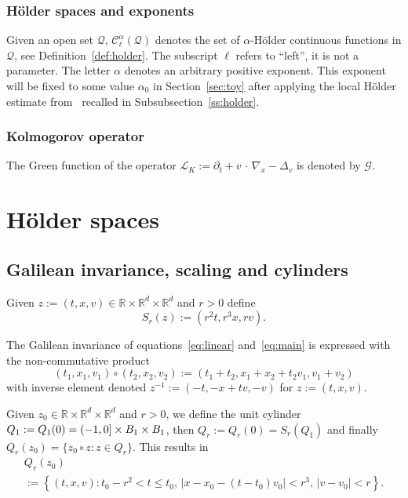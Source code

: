 \documentclass[10pt]{amsart}
\theoremstyle{definition}\newtheorem{defi}[theo]{Definition}\newtheorem{rema}[theo]{Remark}\newtheorem{exam}[theo]{Example}\newtheorem{exem}[theo]{Example}\newtheorem{nota}[theo]{Notation}
\newcommand{\R}{\mathbb{R}}
\newcommand{\cC}{\mathcal{C}}
\newcommand{\cL}{\mathcal{L}}
\newcommand{\cG}{\mathcal{G}}
\newcommand{\cQ}{\mathcal{Q}}
\begin{document}
\subsubsection{H\"older spaces and exponents}
Given an open set $\cQ$, $\cC_\ell^\alpha (\cQ)$ denotes the set of $\alpha$-H\"older continuous functions in $\cQ$, see Definition~\ref{def:holder}. The subscript $\ell$ refers to ``left'', it is not a parameter. The letter $\alpha$ denotes an arbitrary positive exponent. This exponent will be fixed to some value $\alpha_0$ in Section~\ref{sec:toy} after applying the local H\"older estimate from~\cite{gimv,wz09} recalled in Subsubsection~\ref{ss:holder}.

\subsubsection{Kolmogorov operator}
The Green function of the operator $\cL_K := \partial_t + v \,\cdot\,\nabla_x-\Delta_v$ is denoted by $\cG$.

\section{H\"older spaces}\label{sec:prelim}

\subsection{Galilean invariance, scaling and cylinders}

Given $z := (t,x,v) \in \R \times \R^d \times \R^d$ and $r>0$ define
\begin{equation}\label{eq:scaling}
S_r(z) := \left(r^2 t,r^3 x, r v\right).
\end{equation}

The Galilean invariance of equations~\eqref{eq:linear} and~\eqref{eq:main} is expressed with the non-commutative product
\[
\left(t_1,x_1,v_1\right) \circ \left(t_2,x_2,v_2\right) := \left(t_1+t_2,x_1 +x_2 + t_2 v_1,v_1 + v_2\right)
\]
with inverse element denoted $z^{-1} := (-t,-x+tv,-v)$ for $z:=(t,x,v)$.

Given $z_0 \in \R \times \R^d \times \R^d$ and $r >0$, we define the unit cylinder $Q_1:=Q_1(0)\linebreak=(-1,0]\times B_1 \times B_1$, then $Q_r:=Q_r(0) = S_r(Q_1)$ and finally $Q_r (z_0) = \{ z_0 \circ z: z \in Q_r\}$. This results in
\begin{multline}\label{eq:def-cyl}
Q_r (z_0)\\
:= \left\{ (t,x,v) : t_0 - r^2 < t \le t_0, \, |x-x_0 - (t-t_0)v_0| < r^3, \, |v-v_0| < r \right\}.
\end{multline}
\end{document}
